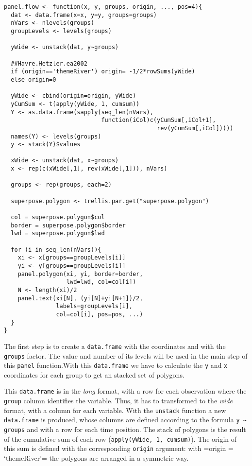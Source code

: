 \lstset{language=R}
\begin{lstlisting}
panel.flow <- function(x, y, groups, origin, ..., pos=4){
  dat <- data.frame(x=x, y=y, groups=groups)
  nVars <- nlevels(groups)
  groupLevels <- levels(groups)

  yWide <- unstack(dat, y~groups)

  ##Havre.Hetzler.ea2002
  if (origin=='themeRiver') origin= -1/2*rowSums(yWide)
  else origin=0 

  yWide <- cbind(origin=origin, yWide)
  yCumSum <- t(apply(yWide, 1, cumsum))
  Y <- as.data.frame(sapply(seq_len(nVars),
                            function(iCol)c(yCumSum[,iCol+1],
                                            rev(yCumSum[,iCol]))))
  names(Y) <- levels(groups)
  y <- stack(Y)$values

  xWide <- unstack(dat, x~groups)
  x <- rep(c(xWide[,1], rev(xWide[,1])), nVars)

  groups <- rep(groups, each=2)

  superpose.polygon <- trellis.par.get("superpose.polygon")

  col = superpose.polygon$col
  border = superpose.polygon$border 
  lwd = superpose.polygon$lwd 

  for (i in seq_len(nVars)){
    xi <- x[groups==groupLevels[i]]
    yi <- y[groups==groupLevels[i]]
    panel.polygon(xi, yi, border=border,
                  lwd=lwd, col=col[i])
    N <- length(xi)/2
    panel.text(xi[N], (yi[N]+yi[N+1])/2,
               labels=groupLevels[i],
               col=col[i], pos=pos, ...)
  }
}
\end{lstlisting}

The first step is to create a \texttt{data.frame} with the coordinates
and with the \texttt{groups} factor. The value and number of its levels
will be used in the main step of this \texttt{panel} function.With this
\texttt{data.frame} we have to calculate the \texttt{y} and \texttt{x} coordinates for
each group to get an stacked set of polygons.

This \texttt{data.frame} is in the \emph{long} format, with a row for each
observation where the \texttt{group} column identifies the
variable. Thus, it has to transformed to the \emph{wide} format, with a
column for each variable. With the \texttt{unstack} function a new
\texttt{data.frame} is produced, whose columns are defined according to
the formula \texttt{y \textasciitilde{} groups} and with a row for each time
position. The stack of polygons is the result of the cumulative
sum of each row (\texttt{apply(yWide, 1, cumsum)}). The origin of this sum
is defined with the corresponding \texttt{origin} argument: with =origin
= `themeRiver'= the polygons are arranged in a symmetric way.

